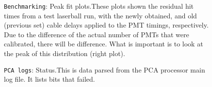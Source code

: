\documentclass[12pt]{article}
\begin{document}
\begin{figure}
\centering
\noindent{}
  \caption{\centering \texttt{Benchmarking}: Peak fit plots.\hspace{\textwidth}These plots shown the residual hit times from a test laserball run, with the newly obtained, and old (previous set) cable delays applied to the PMT timings, respectively. Due to the difference of the actual number of PMTs that were calibrated, there will be difference. What is important is to look at the peak of this distribution (right plot).}
  \label{fig:bench7}
\end{figure}

\begin{figure}
\centering
\noindent{}
  \caption{\centering \texttt{PCA logs}: Status.\hspace{\textwidth}This is data parsed from the PCA processor main log file. It lists bits that failed.}
  \label{fig:log0}
\end{figure}
\end{document}
